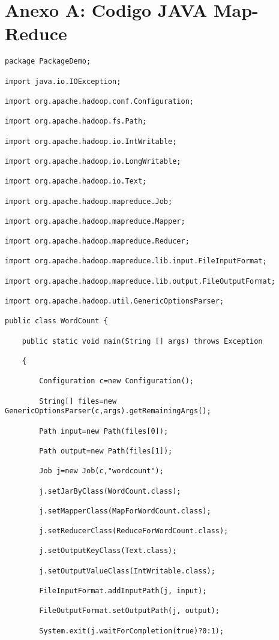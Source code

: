 \section{Anexo A: Codigo JAVA Map-Reduce}
\begin{lstlisting} 
package PackageDemo;

import java.io.IOException;

import org.apache.hadoop.conf.Configuration;

import org.apache.hadoop.fs.Path;

import org.apache.hadoop.io.IntWritable;

import org.apache.hadoop.io.LongWritable;

import org.apache.hadoop.io.Text;

import org.apache.hadoop.mapreduce.Job;

import org.apache.hadoop.mapreduce.Mapper;

import org.apache.hadoop.mapreduce.Reducer;

import org.apache.hadoop.mapreduce.lib.input.FileInputFormat;

import org.apache.hadoop.mapreduce.lib.output.FileOutputFormat;

import org.apache.hadoop.util.GenericOptionsParser;

public class WordCount {

	public static void main(String [] args) throws Exception
	
	{
	
		Configuration c=new Configuration();
		
		String[] files=new GenericOptionsParser(c,args).getRemainingArgs();
		
		Path input=new Path(files[0]);
		
		Path output=new Path(files[1]);
		
		Job j=new Job(c,"wordcount");
		
		j.setJarByClass(WordCount.class);
		
		j.setMapperClass(MapForWordCount.class);
		
		j.setReducerClass(ReduceForWordCount.class);
		
		j.setOutputKeyClass(Text.class);
		
		j.setOutputValueClass(IntWritable.class);
		
		FileInputFormat.addInputPath(j, input);
		
		FileOutputFormat.setOutputPath(j, output);
		
		System.exit(j.waitForCompletion(true)?0:1);
	

\end{lstlisting}
